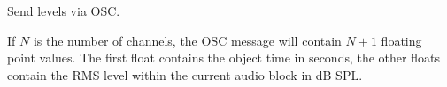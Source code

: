 Send levels via OSC.



If $N$ is the number of channels, the OSC message will contain $N+1$
floating point values. The first float contains the object time in
seconds, the other floats contain the RMS level within the current
audio block in dB SPL.
